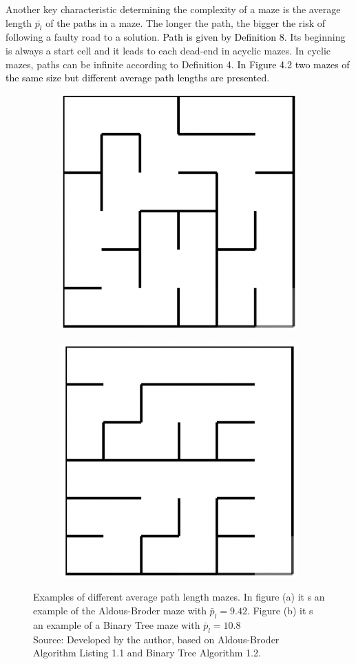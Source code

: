 \newline
Another key characteristic determining the complexity of a maze is the average length $\bar{p_l}$ of the paths in a maze. The longer the path, the bigger
the risk of following a faulty road to a solution. \textcolor{black}{Path is given by Definition 8}. Its beginning is always a start cell and it leads to
each dead-end in acyclic mazes. In cyclic mazes, paths can be infinite according to Definition 4. \textcolor{black}{In Figure 4.2 two mazes of the same size
but different average path lengths are presented}.
\newline
\begin{figure}[!h]
\centering
\begin{subfigure}{.5\textwidth}
\centering
\includegraphics[width=.5\linewidth]{aldous}
\caption{}
\label{fig:sub1}
\end{subfigure}%
\begin{subfigure}{.5\textwidth}
\centering
\includegraphics[width=.5\linewidth]{binary}
\caption{}
\label{fig:sub2}
\end{subfigure}
\caption{Examples of different average path length mazes. In figure (a) it s an example of the Aldous-Broder maze with $\bar{p}_l = 9.42$. Figure (b) it s an example of a Binary Tree maze with $\bar{p}_l = 10.8$\\ Source: Developed by the author,  based on Aldous-Broder Algorithm Listing 1.1 and Binary Tree Algorithm 1.2. }
\label{fig:test}
\end{figure}
